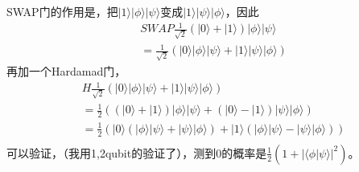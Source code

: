 SWAP门的作用是，把$|1\rangle |\phi\rangle |\psi\rangle$变成$|1\rangle |\psi\rangle |\phi\rangle$，因此
\begin{equation}
\begin{split}
&SWAP \frac{1}{\sqrt{2}}\left(|0\rangle + |1\rangle\right)|\phi\rangle |\psi\rangle \\
&=\frac{1}{\sqrt{2}}\left(|0\rangle |\phi\rangle |\psi\rangle + |1\rangle |\psi\rangle |\phi\rangle\right)
\end{split}
\end{equation}
再加一个Hardamad门，
\begin{equation}
\begin{split}
&H\frac{1}{\sqrt{2}}\left(|0\rangle |\phi\rangle |\psi\rangle + |1\rangle |\psi\rangle |\phi\rangle\right)\\
&=\frac{1}{2}\left(\left(|0\rangle + |1\rangle\right) |\phi\rangle |\psi\rangle + \left(|0\rangle - |1\rangle\right) |\psi\rangle |\phi\rangle\right)\\
&=\frac{1}{2}\left(|0\rangle\left(|\phi\rangle |\psi\rangle+|\psi\rangle |\phi\rangle\right) + |1\rangle\left(|\phi\rangle |\psi\rangle-|\psi\rangle |\phi\rangle\right)\right)\\
\end{split}
\end{equation}
可以验证，（我用1,2qubit的验证了），测到0的概率是$\frac{1}{2}(1+|\langle \phi|\psi\rangle|^2)$。
